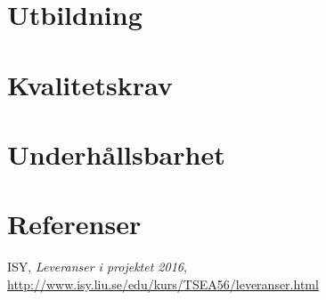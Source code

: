 \documentclass[11pt]{article}
\begin{document}
\begin{flushleft}
\section{Utbildning}

\section{Kvalitetskrav}

\section{Underhållsbarhet}


\pagebreak
\section{Referenser}

\begin{thebibliography}{9}
ISY,
\emph{Leveranser i projektet 2016},
\url{http://www.isy.liu.se/edu/kurs/TSEA56/leveranser.html}
	
\end{thebibliography}



\end{flushleft}
\end{document}
